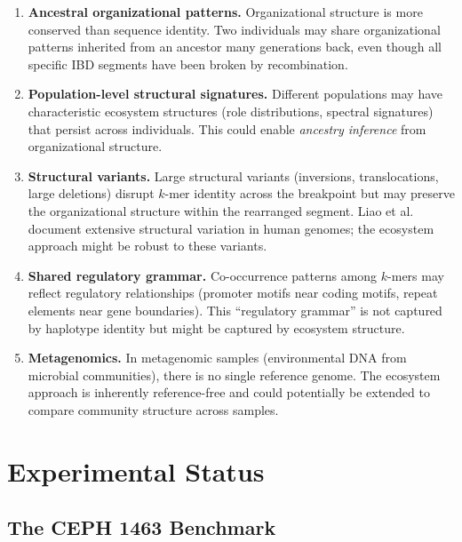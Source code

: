 \documentclass{../yalumba}
\begin{document}
\begin{enumerate}
  \item \textbf{Ancestral organizational patterns.}  Organizational
    structure is more conserved than sequence identity.  Two individuals
    may share organizational patterns inherited from an ancestor many
    generations back, even though all specific IBD segments have been
    broken by recombination.

  \item \textbf{Population-level structural signatures.}  Different
    populations may have characteristic ecosystem structures (role
    distributions, spectral signatures) that persist across individuals.
    This could enable \emph{ancestry inference} from organizational
    structure.

  \item \textbf{Structural variants.}  Large structural variants
    (inversions, translocations, large deletions) disrupt $k$-mer
    identity across the breakpoint but may preserve the
    organizational structure within the rearranged segment.
    Liao et al.~\cite{liao2025sv} document extensive structural
    variation in human genomes; the ecosystem approach might be
    robust to these variants.

  \item \textbf{Shared regulatory grammar.}  Co-occurrence patterns
    among $k$-mers may reflect regulatory relationships (promoter
    motifs near coding motifs, repeat elements near gene boundaries).
    This ``regulatory grammar'' is not captured by haplotype identity
    but might be captured by ecosystem structure.

  \item \textbf{Metagenomics.}  In metagenomic samples (environmental
    DNA from microbial communities), there is no single reference genome.
    The ecosystem approach is inherently reference-free and could
    potentially be extended to compare community structure across
    samples.
\end{enumerate}


\section{Experimental Status}
\label{sec:status}

\subsection{The CEPH 1463 Benchmark}
\label{sec:status:benchmark}
\end{document}
